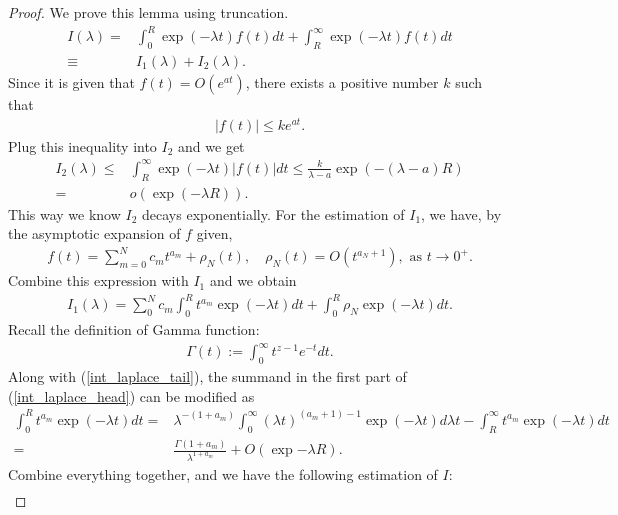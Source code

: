 \documentclass[10pt]{article}
\newenvironment{Proof of lemma}{\noindent{\bf Proof of Lemma}}{\hfill$\Box$\newline}
\newenvironment{Proof of claim}{\noindent{\bf Proof of claim}}{\hfill$\Box$\newline}
\newenvironment{Proof of theorem}{\noindent{\bf Proof of Theorem}}{\hfill\scriptsize{$\Box$}\newline}
\newenvironment{Proof of theorems}{\noindent{\bf Proof of Theorems}}{\hfill$\Box$\newline}
\newenvironment{Proof of proposition}{\noindent{\bf Proof of Proposition}}{\hfill$\Box$\newline}
\newenvironment{Proof of propositions}{\noindent{\bf Proof of Propositions}}{\hfill$\Box$\newline}
\newenvironment{Proof of exercise}{\noindent{\it Proof of Exercise:}}{\hfill$\Box$}
\numberwithin{equation}{section}
\begin{document}
\begin{proof}
    We prove this lemma using truncation.
    \begin{align}
        I(\lambda) =& \int_0^R \exp(-\lambda t) f(t) dt + \int_R^{\infty} \exp(-\lambda t) f(t) dt \nonumber \\
        \equiv& I_1(\lambda) + I_2(\lambda).
    \end{align}
    Since it is given that $f(t) = O(e^{at})$, there exists a positive number $k$ such that
    \begin{align}
        |f(t)| \leq k e^{at}.
    \end{align}
    Plug this inequality into $I_2$ and we get
    \begin{align} \label{int_laplace_tail}
        I_2(\lambda) \leq& \int_R^{\infty} \exp(-\lambda t) |f(t)| dt \leq \frac{k}{\lambda - a} \exp(-(\lambda-a)R) \nonumber \\
        =& o(\exp(-\lambda R)).
    \end{align}
    This way we know $I_2$ decays exponentially. For the estimation of $I_1$, we have, by the asymptotic expansion of $f$ given, 
    \begin{align}
        f(t) = \sum_{m=0}^{N} c_m t^{a_m} + \rho_N(t), \quad \rho_N(t) = O(t^{a_N+1}), \text{ as } t\to 0^+.
    \end{align}
    Combine this expression with $I_1$ and we obtain
    \begin{align} \label{int_laplace_head}
        I_1(\lambda) = \sum_0^N c_m \int_0^R t^{a_m} \exp(-\lambda t) dt  + \int_0^R \rho_N \exp(-\lambda t) dt.
    \end{align}
    Recall the definition of Gamma function:
    \begin{align}
        \Gamma(t) := \int_0^{\infty} t^{z-1}e^{-t} dt.
    \end{align}
    Along with (\ref{int_laplace_tail}), the summand in the first part of (\ref{int_laplace_head}) can be modified as
    \begin{align} \label{int_laplace_gamma}
        \int_0^R t^{a_m} \exp(-\lambda t) dt =& \lambda^ {-(1+a_m)}\int_0^\infty (\lambda t)^{(a_m+1)-1} \exp(-\lambda t) d \lambda t - \int_R^{\infty} t^{a_m} \exp(-\lambda t) dt \nonumber \\
        =& \frac{\Gamma(1+a_m)}{\lambda^{1+a_m}} + O(\exp{-\lambda R}).
    \end{align}
    Combine everything together, and we have the following estimation of $I$:
    \begin{align} \label{int_laplace_withrho}

\end{align}
\end{proof}
\end{document}
